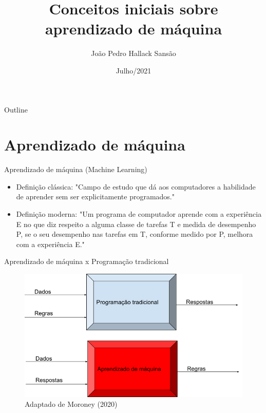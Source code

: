 \documentclass[aspectratio=169,presentation,mathserif,10pt]{beamer}
\author{João Pedro Hallack Sansão}
\date{Julho/2021}
\title{Conceitos iniciais sobre aprendizado de máquina}
\begin{document}
\maketitle
\begin{frame}{Outline}
\tableofcontents
\end{frame}








\section{Aprendizado de máquina}
\label{sec:org739c244}

\begin{frame}[label={sec:org9621850}]{Aprendizado de máquina (Machine Learning)}
\begin{itemize}
\item Definição clássica: "Campo de estudo que dá aos computadores a
habilidade de aprender sem ser explicitamente programados."

\item Definição moderna: "Um programa de computador aprende com a
experiência E no que diz respeito a alguma classe de tarefas T e
medida de desempenho P, se o seu desempenho nas tarefas em T,
conforme medido por P, melhora com a experiência E."
\end{itemize}
\end{frame}



\begin{frame}[label={sec:orgc98bbc7}]{Aprendizado de máquina x Programação tradicional}
\begin{figure}[htbp]
\centering
\includegraphics[height=0.7\textheight]{./fig/mlct.png}
\caption{Adaptado de Moroney (2020)}
\end{figure}
\end{frame}
\end{document}
